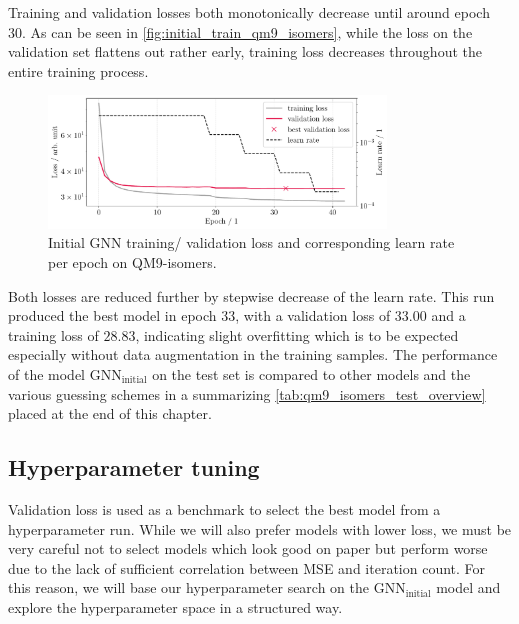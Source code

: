 Training and validation losses both monotonically decrease until around epoch 30. As can be seen in \autoref{fig:initial_train_qm9_isomers}, while the loss on the validation set flattens out rather early, training loss decreases throughout the entire training process. 
\begin{figure}[H]
    \centering
    \includegraphics[width=0.8\textwidth]{../fig/gnn/MGNN_6-31G_NO_AUG_07_07_manual_ref_train_val_loss.pdf}
    \caption[Initial GNN loss on QM9-isomers]{Initial GNN training/ validation loss and corresponding learn rate per epoch on QM9-isomers.}
    \label{fig:initial_train_qm9_isomers}
\end{figure}
Both losses are reduced further by stepwise decrease of the learn rate. This run produced the best model in epoch 33, with a validation loss of $33.00$ and a training loss of $28.83$, indicating slight overfitting which is to be expected especially without data augmentation in the training samples. The performance of the model $\text{GNN}_\text{initial}$ on the test set is compared to other models and the various guessing schemes in a summarizing \autoref{tab:qm9_isomers_test_overview} placed at the end of this chapter. 

\subsection{Hyperparameter tuning}
\label{subsec:qm9_isomers_hyperparamtuning}
Validation loss is used as a benchmark to select the best model from a hyperparameter run. While we will also prefer models with lower loss, we must be very careful not to select models which look good on paper but perform worse due to the lack of sufficient correlation between MSE and iteration count. For this reason, we will base our hyperparameter search on the $\text{GNN}_\text{initial}$ model and explore the hyperparameter space in a structured way. 

